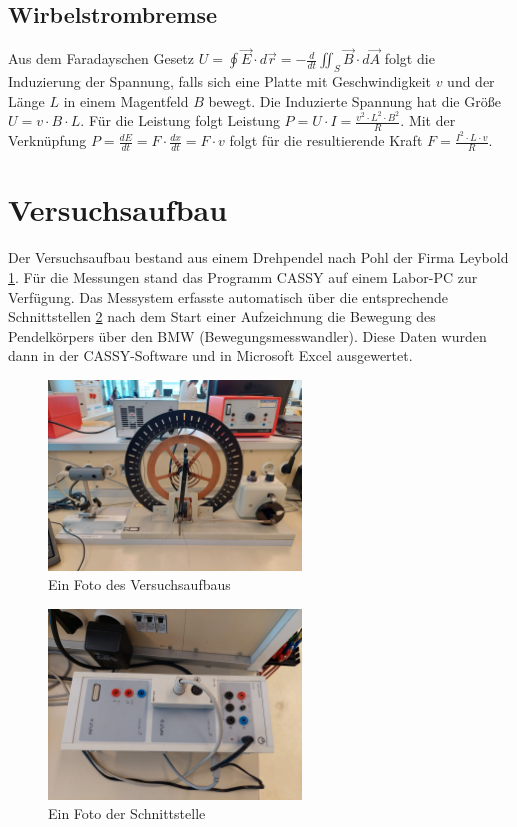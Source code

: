 \documentclass{article}
\begin{document}
\subsection{Wirbelstrombremse}
Aus dem Faradayschen Gesetz $U = \oint \vec{E} \cdot d \vec{r} = -\frac{d}{dt} \iint_S \vec{B} \cdot d \vec{A}$ folgt die Induzierung der Spannung,
falls sich eine Platte mit Geschwindigkeit $v$ und der Länge $L$ in einem Magentfeld $B$ bewegt. Die Induzierte Spannung hat die Größe $U = v \cdot B \cdot L$.
Für die Leistung folgt Leistung $P = U \cdot I = \frac{v^2 \cdot L^2 \cdot B^2}{R}$. Mit der Verknüpfung $P = \frac{dE}{dt} = F \cdot \frac{dx}{dt} = F \cdot v$ folgt
für die resultierende Kraft $F = \frac{I^2 \cdot L \cdot v}{R}$.

\section{Versuchsaufbau}
Der Versuchsaufbau bestand aus einem Drehpendel nach Pohl der Firma Leybold \ref{fig:versuchsaufbau}.
Für die Messungen stand das Programm CASSY auf einem Labor-PC zur Verfügung.
Das Messystem erfasste automatisch über die entsprechende Schnittstellen \ref{fig:schnittstelle}
nach dem Start einer Aufzeichnung die Bewegung des Pendelkörpers
über den BMW (Bewegungsmesswandler). Diese Daten wurden dann in der CASSY-Software
und in Microsoft Excel ausgewertet.

\begin{figure}[H]
    \centering
    \includegraphics[width=0.6\textwidth]{bilder/drehpendel.jpg}
    \caption{Ein Foto des Versuchsaufbaus}
    \label{fig:versuchsaufbau}
\end{figure}

\begin{figure}[H]
    \centering
    \includegraphics[width=0.6\textwidth]{bilder/sensor_cassy.jpg}
    \caption{Ein Foto der Schnittstelle}
    \label{fig:schnittstelle}
\end{figure}
\end{document}
